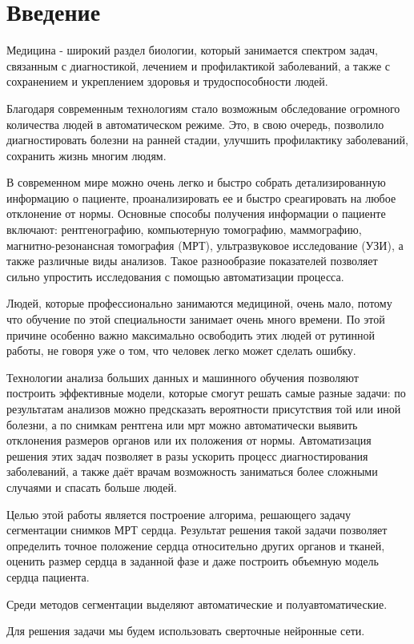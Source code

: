 \section{Введение}
Медицина - широкий раздел биологии, который занимается спектром задач, связанным с диагностикой, лечением и профилактикой заболеваний, а также с сохранением и укреплением здоровья и трудоспособности людей. 

Благодаря современным технологиям стало возможным обследование огромного количества людей в автоматическом режиме. Это, в свою очередь, позволило диагностировать болезни на ранней стадии, улучшить профилактику заболеваний, сохранить жизнь многим людям.

В современном мире можно очень легко и быстро собрать детализированную информацию о пациенте, проанализировать ее и быстро среагировать на любое отклонение от нормы. Основные способы получения информации о пациенте включают: рентгенографию, компьютерную томографию, маммографию, магнитно-резонансная томография (МРТ), ультразвуковое исследование (УЗИ), а также различные виды анализов. Такое разнообразие показателей позволяет сильно упростить исследования с помощью автоматизации процесса.

Людей, которые профессионально занимаются медициной, очень мало, потому что обучение по этой специальности занимает очень много времени. По этой причине особенно важно максимально освободить этих людей от рутинной работы, не говоря уже о том, что человек легко может сделать ошибку.

Технологии анализа больших данных и машинного обучения позволяют построить эффективные модели, которые смогут решать самые разные задачи: по результатам анализов можно предсказать вероятности присутствия той или иной болезни, а по снимкам рентгена или мрт можно автоматически выявить отклонения размеров органов или их положения от нормы. Автоматизация решения этих задач позволяет в разы ускорить процесс диагностирования заболеваний, а также даёт врачам возможность заниматься более сложными случаями и спасать больше людей.

Целью этой работы является построение алгорима, решающего задачу сегментации снимков МРТ сердца. Результат решения такой задачи позволяет определить точное положение сердца относительно других органов и тканей, оценить размер сердца в заданной фазе и даже построить объемную модель сердца пациента.

Среди методов сегментации выделяют автоматические и полуавтоматические. 

Для решения задачи мы будем использовать сверточные нейронные сети.

